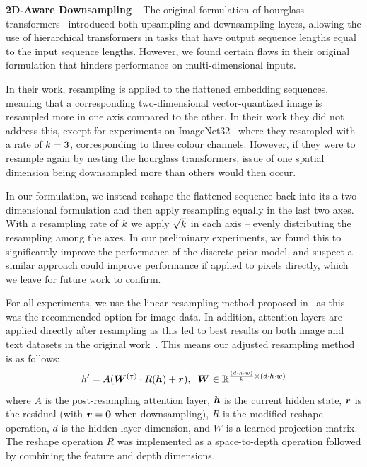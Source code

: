\textbf{2D-Aware Downsampling} -- The original formulation of hourglass
transformers~\cite{nawrot2021hierarchical} introduced both upsampling and
downsampling layers, allowing the use of hierarchical transformers in tasks that
have output sequence lengths equal to the input sequence lengths. However,
we found certain flaws in their original formulation that hinders performance on
multi-dimensional inputs.

In their work, resampling is applied to the flattened embedding sequences,
meaning that a corresponding two-dimensional vector-quantized image is resampled
more in one axis compared to the other. In their work they did not address this,
except for experiments on ImageNet32~\cite{russakovsky2015imagenet} where they
resampled with a rate of $k=3$, corresponding to three colour
channels. However, if they were to resample again by nesting the hourglass
transformers, issue of one spatial dimension being
downsampled more than others would then occur.

In our formulation, we instead reshape the flattened sequence back into its a
two-dimensional formulation and then apply resampling equally in the last two axes.
With a resampling rate of $k$ we apply $\sqrt{k}$ in
each axis -- evenly distributing the resampling among the axes. In our
preliminary experiments, we found this to significantly improve the performance
of the discrete prior model, and suspect a similar approach could improve
performance if applied to pixels directly, which we leave for future work to
confirm.

For all experiments, we use the linear resampling method proposed
in~\cite{nawrot2021hierarchical} as this was the recommended option for image
data. In addition, attention layers are applied directly after resampling as
this led to best results on both image and text datasets in the original
work~\cite{nawrot2021hierarchical}. This means our adjusted resampling method is
as follows:
\begin{equation}
    h' = A({\bm{W}}^{(\intercal)} \cdot R({\bm{h}}) + {\bm{r}}), \;\; {\bm{W}} \in
    \mathbb{R}^{\frac{(d \cdot h \cdot w)}{k} \times (d \cdot h \cdot w)}
\end{equation}
where $A$ is the post-resampling attention layer, ${\bm{h}}$ is the current hidden
state, ${\bm{r}}$ is the residual (with ${\bm{r}} = \bm{0}$ when downsampling), $R$ is the
modified reshape operation, $d$ is the hidden layer dimension, and $W$ is a
learned projection matrix. The reshape operation $R$ was implemented as a
space-to-depth operation followed by combining the feature and depth dimensions.

